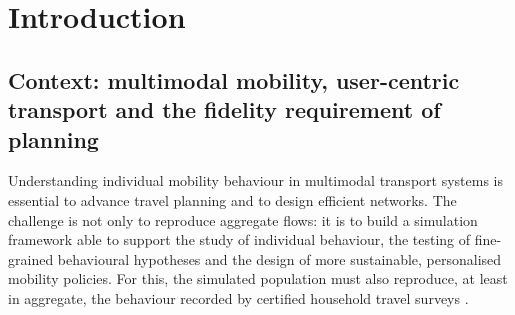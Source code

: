 
\section{Introduction}
\label{sec:intro}

\subsection{Context: multimodal mobility, user-centric transport and the fidelity requirement of planning}

Understanding individual mobility behaviour in multimodal transport systems is essential to advance travel planning and to design efficient networks. The challenge is not only to reproduce aggregate flows: it is to build a simulation framework able to support the study of individual behaviour, the testing of fine-grained behavioural hypotheses and the design of more sustainable, personalised mobility policies. For this, the simulated population must also reproduce, at least in aggregate, the behaviour recorded by certified household travel surveys \citep{tisseo2023emc2}.

